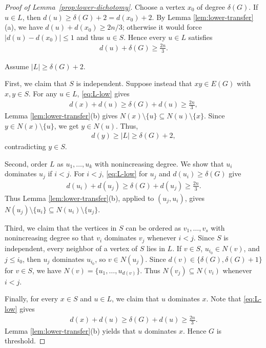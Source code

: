 \documentclass[10pt,a4paper]{article}
\begin{document}
\begin{proof}[Proof of Lemma~\ref{prop:lower-dichotomy}]
Choose a vertex $x_0$ of degree $\delta(G)$.  If $u\in L$, then $d(u)\ge\delta(G)+2=d(x_0)+2$.  By Lemma \ref{lem:lower-transfer}(a), we have $d(u)+d(x_0)\ge2n/3$; otherwise it would force $|d(u)-d(x_0)|\le1$ and thus $u\in S$.  Hence every $u\in L$ satisfies
\begin{align}\label{eq:L-low}
  d(u)+\delta(G)\ge \frac{2n}{3}.
\end{align}

Assume $|L|\ge\delta(G)+2$.  

First, we claim that $S$ is independent.  Suppose instead that $xy\in E(G)$ with $x,y\in S$.  For any $u\in L$, \eqref{eq:L-low} gives
\begin{align*}
  d(x)+d(u)\ge\delta(G)+d(u)\ge\frac{2n}{3},
\end{align*}
Lemma \ref{lem:lower-transfer}(b) gives
$
  N(x)\setminus\{u\}\subseteq N(u)\setminus\{x\}.
$ 
Since $y\in N(x)\setminus\{u\}$, we get $y\in N(u)$.  Thus, %
\begin{align*}
  d(y)\ge |L|\ge\delta(G)+2,
\end{align*}
contradicting $y\in S$.

Second, order $L$ as $u_1,\ldots,u_k$ with nonincreasing degree.  We show that
$u_i$ dominates $u_j$ if $i<j$.  For $i<j$, \eqref{eq:L-low} for $u_j$ and
$d(u_i)\ge\delta(G)$ give
\begin{align*}
  d(u_i)+d(u_j)\ge\delta(G)+d(u_j)\ge\frac{2n}{3}.
\end{align*}
Thus Lemma \ref{lem:lower-transfer}(b), applied to $(u_j,u_i)$, gives
$
  N(u_j)\setminus\{u_i\}\subseteq N(u_i)\setminus\{u_j\}.
$

Third, we claim that the vertices in $S$ can be ordered as
$v_1,\ldots,v_s$ with nonincreasing degree so that $v_i$ dominates $v_j$
whenever $i<j$.  Since $S$ is independent, every neighbor of a vertex of $S$
lies in $L$.  If $v\in S$, $u_{i_0}\in N(v)$, and $j\le i_0$, then $u_{j}$ dominates
$u_{i_0}$, so $v\in N(u_j)$.  Since $d(v)\in\{\delta(G),\delta(G)+1\}$ for $v\in S$, we have $N(v)=\{u_1,\dots,u_{d(v)}\}$.  Thus
$N(v_j)\subseteq N(v_i)$ whenever $i<j$.

Finally, for every $x\in S$ and $u\in L$, we claim that $u$ dominates $x$. Note that \eqref{eq:L-low} gives
\begin{align*}
  d(x)+d(u)\ge\delta(G)+d(u)\ge\frac{2n}{3}.
\end{align*}
Lemma \ref{lem:lower-transfer}(b) yields that $u$ dominates $x$.  Hence $G$ is threshold.
\end{proof}
\end{document}
